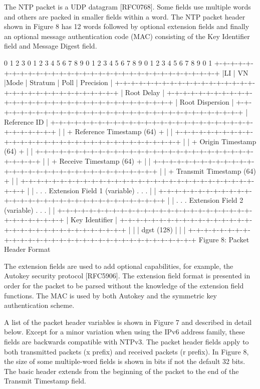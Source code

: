 The NTP packet is a UDP datagram [RFC0768]. Some fields use multiple
words and others are packed in smaller fields within a word. The NTP
packet header shown in Figure 8 has 12 words followed by optional
extension fields and finally an optional message authentication code
(MAC) consisting of the Key Identifier field and Message Digest
field.

0 1 2 3
0 1 2 3 4 5 6 7 8 9 0 1 2 3 4 5 6 7 8 9 0 1 2 3 4 5 6 7 8 9 0 1
+-+-+-+-+-+-+-+-+-+-+-+-+-+-+-+-+-+-+-+-+-+-+-+-+-+-+-+-+-+-+-+-+
|LI | VN |Mode | Stratum | Poll | Precision |
+-+-+-+-+-+-+-+-+-+-+-+-+-+-+-+-+-+-+-+-+-+-+-+-+-+-+-+-+-+-+-+-+
| Root Delay |
+-+-+-+-+-+-+-+-+-+-+-+-+-+-+-+-+-+-+-+-+-+-+-+-+-+-+-+-+-+-+-+-+
| Root Dispersion |
+-+-+-+-+-+-+-+-+-+-+-+-+-+-+-+-+-+-+-+-+-+-+-+-+-+-+-+-+-+-+-+-+
| Reference ID |
+-+-+-+-+-+-+-+-+-+-+-+-+-+-+-+-+-+-+-+-+-+-+-+-+-+-+-+-+-+-+-+-+
| |
+ Reference Timestamp (64) +
| |
+-+-+-+-+-+-+-+-+-+-+-+-+-+-+-+-+-+-+-+-+-+-+-+-+-+-+-+-+-+-+-+-+
| |
+ Origin Timestamp (64) +
| |
+-+-+-+-+-+-+-+-+-+-+-+-+-+-+-+-+-+-+-+-+-+-+-+-+-+-+-+-+-+-+-+-+
| |
+ Receive Timestamp (64) +
| |
+-+-+-+-+-+-+-+-+-+-+-+-+-+-+-+-+-+-+-+-+-+-+-+-+-+-+-+-+-+-+-+-+
| |
+ Transmit Timestamp (64) +
| |
+-+-+-+-+-+-+-+-+-+-+-+-+-+-+-+-+-+-+-+-+-+-+-+-+-+-+-+-+-+-+-+-+
| |
. .
. Extension Field 1 (variable) .
. .
| |
+-+-+-+-+-+-+-+-+-+-+-+-+-+-+-+-+-+-+-+-+-+-+-+-+-+-+-+-+-+-+-+-+
| |
. .
. Extension Field 2 (variable) .
. .
| |
+-+-+-+-+-+-+-+-+-+-+-+-+-+-+-+-+-+-+-+-+-+-+-+-+-+-+-+-+-+-+-+-+
| Key Identifier |
+-+-+-+-+-+-+-+-+-+-+-+-+-+-+-+-+-+-+-+-+-+-+-+-+-+-+-+-+-+-+-+-+
| |
| dgst (128) |
| |
+-+-+-+-+-+-+-+-+-+-+-+-+-+-+-+-+-+-+-+-+-+-+-+-+-+-+-+-+-+-+-+-+
Figure 8: Packet Header Format

The extension fields are used to add optional capabilities, for
example, the Autokey security protocol [RFC5906]. The extension
field format is presented in order for the packet to be parsed
without the knowledge of the extension field functions. The MAC is
used by both Autokey and the symmetric key authentication scheme.

A list of the packet header variables is shown in Figure 7 and
described in detail below. Except for a minor variation when using
the IPv6 address family, these fields are backwards compatible with
NTPv3. The packet header fields apply to both transmitted packets (x
prefix) and received packets (r prefix). In Figure 8, the size of
some multiple-word fields is shown in bits if not the default 32
bits. The basic header extends from the beginning of the packet to
the end of the Transmit Timestamp field.

